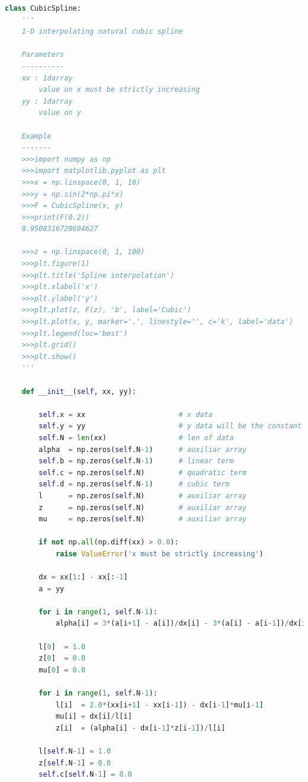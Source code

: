 \documentclass[10pt,a4paper]{article}
\begin{document}
\begin{lstlisting}[language=Python]
class CubicSpline:
    '''
    1-D interpolating natural cubic spline
    
    Parameters
    ----------
    xx : 1darray
        value on x must be strictly increasing
    yy : 1darray
        value on y
    
    Example
    -------
    >>>import numpy as np
    >>>import matplotlib.pyplot as plt
    >>>x = np.linspace(0, 1, 10)
    >>>y = np.sin(2*np.pi*x)
    >>>F = CubicSpline(x, y)
    >>>print(F(0.2))
    0.9508316728694627
    
    >>>z = np.linspace(0, 1, 100)
    >>>plt.figure(1)
    >>>plt.title('Spline interpolation')
    >>>plt.xlabel('x')
    >>>plt.ylabel('y')
    >>>plt.plot(z, F(z), 'b', label='Cubic')
    >>>plt.plot(x, y, marker='.', linestyle='', c='k', label='data')
    >>>plt.legend(loc='best')
    >>>plt.grid()
    >>>plt.show()
    '''

    def __init__(self, xx, yy):
    
        self.x = xx                      # x data
        self.y = yy                      # y data will be the constant of polynomial
        self.N = len(xx)                 # len of data     
        alpha  = np.zeros(self.N-1)      # auxiliar array
        self.b = np.zeros(self.N-1)      # linear term
        self.c = np.zeros(self.N)        # quadratic term
        self.d = np.zeros(self.N-1)      # cubic term
        l      = np.zeros(self.N)        # auxiliar array
        z      = np.zeros(self.N)        # auxiliar array
        mu     = np.zeros(self.N)        # auxiliar array
        
        if not np.all(np.diff(xx) > 0.0):
            raise ValueError('x must be strictly increasing')
        
        dx = xx[1:] - xx[:-1]
        a = yy

        for i in range(1, self.N-1):
            alpha[i] = 3*(a[i+1] - a[i])/dx[i] - 3*(a[i] - a[i-1])/dx[i-1]
        
        l[0]  = 1.0
        z[0]  = 0.0
        mu[0] = 0.0
        
        for i in range(1, self.N-1):
            l[i]  = 2.0*(xx[i+1] - xx[i-1]) - dx[i-1]*mu[i-1]
            mu[i] = dx[i]/l[i]
            z[i]  = (alpha[i] - dx[i-1]*z[i-1])/l[i]
          
        l[self.N-1] = 1.0
        z[self.N-1] = 0.0
        self.c[self.N-1] = 0.0
        

\end{lstlisting}
\end{document}
